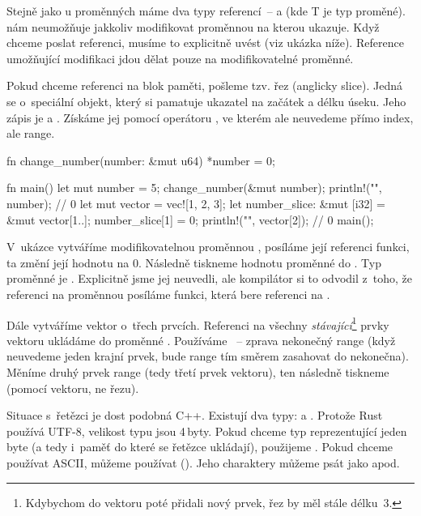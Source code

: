 \documentclass[main.tex]{subfiles}
\begin{document}
Stejně jako u proměnných máme dva typy referencí~--  a  (kde T je
typ proměné).  nám neumožňuje jakkoliv modifikovat proměnnou na kterou ukazuje.
Když chceme poslat referenci, musíme to explicitně uvést (viz ukázka níže). Reference
umožňující modifikaci jdou dělat pouze na modifikovatelné proměnné.

Pokud chceme referenci na blok paměti, pošleme tzv. řez (anglicky slice). Jedná se
o~speciální objekt, který si pamatuje ukazatel na začátek a délku úseku. Jeho zápis je
\irust{&[T]} a . Získáme jej pomocí operátoru \irust{[]}, ve kterém ale
neuvedeme přímo index, ale range.

\obrazek
\begin{rustcode}
        fn change_number(number: &mut u64) {
            *number = 0;
        }

        fn main() {
            let mut number = 5;
            change_number(&mut number);
            println!("{}", number); // 0
            let mut vector = vec![1, 2, 3];
            let number_slice: &mut [i32] = &mut vector[1..];
            number_slice[1] = 0;
            println!("{}", vector[2]); // 0
        }
        main();
\end{rustcode}

V~ukázce vytváříme modifikovatelnou proměnnou , posíláme její referenci
funkci, ta změní její hodnotu na 0. Následně tiskneme hodnotu proměnné do .
Typ proměnné je . Explicitně jsme jej neuvedli, ale kompilátor si to odvodil
z~toho, že referenci na proměnnou posíláme funkci, která bere referenci na .

Dále vytváříme vektor o~třech prvcích. Referenci na všechny \emph{stávající}\footnote{
    Kdybychom do vektoru poté přidali nový prvek, řez by měl stále délku~3.
} prvky vektoru ukládáme do proměnné . Používáme ~--
zprava nekonečný range (když neuvedeme jeden krajní prvek, bude range tím směrem zasahovat
do nekonečna). Měníme druhý prvek range (tedy třetí prvek vektoru), ten následně tiskneme
(pomocí vektoru, ne řezu).


Situace s~řetězci je dost podobná C++. Existují dva typy:  a .
Protože Rust používá UTF-8, velikost typu  jsou 4\,byty. Pokud chceme typ
reprezentující jeden byte (a tedy i~paměť do které se řetězce ukládají), použijeme
. Pokud chceme používat ASCII, můžeme používat  ().
Jeho charaktery můžeme psát jako  apod.
\end{document}
